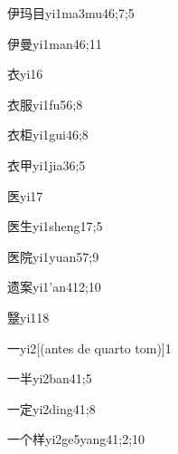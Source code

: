 \begin{verbete}{伊玛目}{yi1ma3mu4}{6;7;5}
\end{verbete}
\begin{verbete}{伊曼}{yi1man4}{6;11}
\end{verbete}
\begin{verbete}{衣}{yi1}{6}
\end{verbete}
\begin{verbete}{衣服}{yi1fu5}{6;8}
\end{verbete}
\begin{verbete}{衣柜}{yi1gui4}{6;8}
\end{verbete}
\begin{verbete}{衣甲}{yi1jia3}{6;5}
\end{verbete}
\begin{verbete}{医}{yi1}{7}
\end{verbete}
\begin{verbete}{医生}{yi1sheng1}{7;5}
\end{verbete}
\begin{verbete}{医院}{yi1yuan5}{7;9}
\end{verbete}
\begin{verbete}{遗案}{yi1'an4}{12;10}
\end{verbete}
\begin{verbete}{毉}{yi1}{18}
\end{verbete}
\begin{verbete}{一}{yi2}[(antes de quarto tom)]{1}
\end{verbete}
\begin{verbete}{一半}{yi2ban4}{1;5}
\end{verbete}
\begin{verbete}{一定}{yi2ding4}{1;8}
\end{verbete}
\begin{verbete}{一个样}{yi2ge5yang4}{1;2;10}
\end{verbete}
